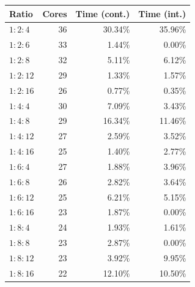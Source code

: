 \begin{tabular*}{\linewidth}{@{\extracolsep{\fill}}lrrr@{}}\toprule
Ratio & Cores & Time (cont.) & Time (int.) \\\midrule
$1:2:4$ & 36 & 30.34\% & 35.96\% \\
$1:2:6$ & 33 & 1.44\% & 0.00\% \\
$1:2:8$ & 32 & 5.11\% & 6.12\% \\
$1:2:12$ & 29 & 1.33\% & 1.57\% \\
$1:2:16$ & 26 & 0.77\% & 0.35\% \\
$1:4:4$ & 30 & 7.09\% & 3.43\% \\
$1:4:8$ & 29 & 16.34\% & 11.46\% \\
$1:4:12$ & 27 & 2.59\% & 3.52\% \\
$1:4:16$ & 25 & 1.40\% & 2.77\% \\
$1:6:4$ & 27 & 1.88\% & 3.96\% \\
$1:6:8$ & 26 & 2.82\% & 3.64\% \\
$1:6:12$ & 25 & 6.21\% & 5.15\% \\
$1:6:16$ & 23 & 1.87\% & 0.00\% \\
$1:8:4$ & 24 & 1.93\% & 1.61\% \\
$1:8:8$ & 23 & 2.87\% & 0.00\% \\
$1:8:12$ & 23 & 3.92\% & 9.95\% \\
$1:8:16$ & 22 & 12.10\% & 10.50\% \\
\bottomrule\end{tabular*}
